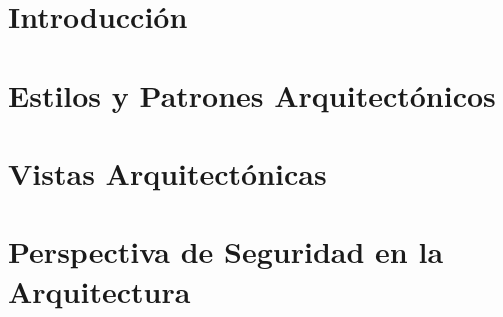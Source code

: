 \renewcommand{\contentsname}{Contenido}
\tableofcontents
\newpage

\section{Introducción}
\label{sec:intro}


\newpage 

\section{Estilos y Patrones Arquitectónicos}
\label{sec:epa}


\newpage 

\section{Vistas Arquitectónicas}\label{sec:va}


\newpage 

\section{Perspectiva de Seguridad en la Arquitectura}\label{sec:va}


\newpage 